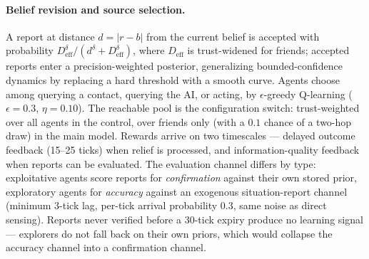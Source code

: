 \documentclass[pdflatex,sn-nature]{sn-jnl}
\begin{document}
\paragraph{Belief revision and source selection.} A report at distance $d = |r - b|$ from the current belief is accepted with probability $D_{\text{eff}}^{\delta} / (d^{\delta} + D_{\text{eff}}^{\delta})$, where $D_{\text{eff}}$ is trust-widened for friends; accepted reports enter a precision-weighted posterior, generalizing bounded-confidence dynamics \citep{deffuant2000mixing} by replacing a hard threshold with a smooth curve. Agents choose among querying a contact, querying the AI, or acting, by $\epsilon$-greedy Q-learning ($\epsilon = 0.3$, $\eta = 0.10$). The reachable pool is the configuration switch: trust-weighted over all agents in the control, over friends only (with a $0.1$ chance of a two-hop draw) in the main model. Rewards arrive on two timescales --- delayed outcome feedback (15--25 ticks) when relief is processed, and information-quality feedback when reports can be evaluated. The evaluation channel differs by type: exploitative agents score reports for \emph{confirmation} against their own stored prior, exploratory agents for \emph{accuracy} against an exogenous situation-report channel (minimum 3-tick lag, per-tick arrival probability $0.3$, same noise as direct sensing). Reports never verified before a 30-tick expiry produce no learning signal --- explorers do not fall back on their own priors, which would collapse the accuracy channel into a confirmation channel.
\end{document}
